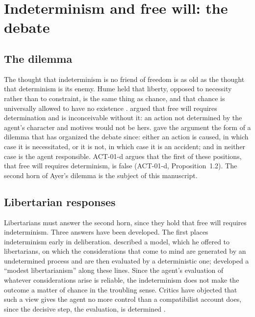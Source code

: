 \documentclass{situationist-preprint}
\begin{document}
\section{Indeterminism and free will: the debate}\label{s:history}

\subsection{The dilemma}

The thought that indeterminism is no friend of freedom is as old as the thought that determinism is its enemy. Hume held that liberty, opposed to necessity rather than to constraint, is the same thing as chance, and that chance is universally allowed to have no existence \citep[VIII]{Hume1748}. \citet{Hobart1934} argued that free will requires determination and is inconceivable without it: an action not determined by the agent's character and motives would not be hers. \citet{Ayer1954} gave the argument the form of a dilemma that has organized the debate since: either an action is caused, in which case it is necessitated, or it is not, in which case it is an accident; and in neither case is the agent responsible. ACT-01-d argues that the first of these positions, that free will requires determinism, is false (ACT-01-d, Proposition~1.2). The second horn of Ayer's dilemma is the subject of this manuscript.

\subsection{Libertarian responses}

Libertarians must answer the second horn, since they hold that free will requires indeterminism. Three answers have been developed. The first places indeterminism early in deliberation. \citet{Dennett1978} described a model, which he offered to libertarians, on which the considerations that come to mind are generated by an undetermined process and are then evaluated by a deterministic one; \citet{Mele1995} developed a \enquote{modest libertarianism} along these lines. Since the agent's evaluation of whatever considerations arise is reliable, the indeterminism does not make the outcome a matter of chance in the troubling sense. Critics have objected that such a view gives the agent no more control than a compatibilist account does, since the decisive step, the evaluation, is determined \citep{Clarke2003}.
\end{document}
